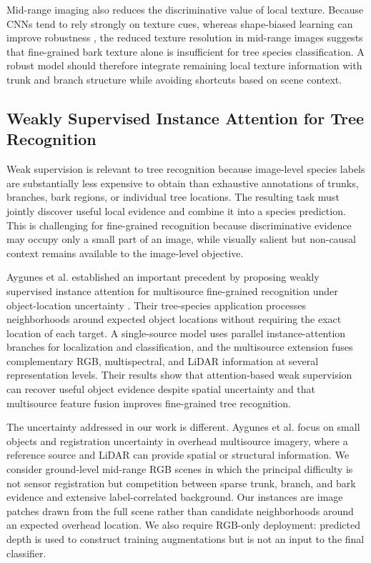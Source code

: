 \documentclass{ieeeaccess}
\begin{document}
Mid-range imaging also reduces the discriminative value of local texture. Because CNNs tend to rely
strongly on texture cues, whereas shape-biased learning can improve robustness \cite{texturebias},
the reduced texture resolution in mid-range images suggests that fine-grained bark texture alone is
insufficient for tree species classification. A robust model should therefore integrate remaining
local texture information with trunk and branch structure while avoiding shortcuts based on scene
context.

\subsection{Weakly Supervised Instance Attention for Tree Recognition}
Weak supervision is relevant to tree recognition because image-level species labels are substantially
less expensive to obtain than exhaustive annotations of trunks, branches, bark regions, or individual
tree locations. The resulting task must jointly discover useful local evidence and combine it into a
species prediction. This is challenging for fine-grained recognition because discriminative evidence
may occupy only a small part of an image, while visually salient but non-causal context remains
available to the image-level objective.

Aygunes et al. established an important precedent by proposing weakly supervised instance attention
for multisource fine-grained recognition under object-location uncertainty \cite{aygunes}. Their
tree-species application processes neighborhoods around expected object locations without requiring
the exact location of each target. A single-source model uses parallel instance-attention branches
for localization and classification, and the multisource extension fuses complementary RGB,
multispectral, and LiDAR information at several representation levels. Their results show that
attention-based weak supervision can recover useful object evidence despite spatial uncertainty and
that multisource feature fusion improves fine-grained tree recognition.

The uncertainty addressed in our work is different. Aygunes et al. focus on small objects and
registration uncertainty in overhead multisource imagery, where a reference source and LiDAR can
provide spatial or structural information. We consider ground-level mid-range RGB scenes in which
the principal difficulty is not sensor registration but competition between sparse trunk, branch,
and bark evidence and extensive label-correlated background. Our instances are image patches drawn
from the full scene rather than candidate neighborhoods around an expected overhead location. We
also require RGB-only deployment: predicted depth is used to construct training augmentations but is
not an input to the final classifier.
\end{document}
